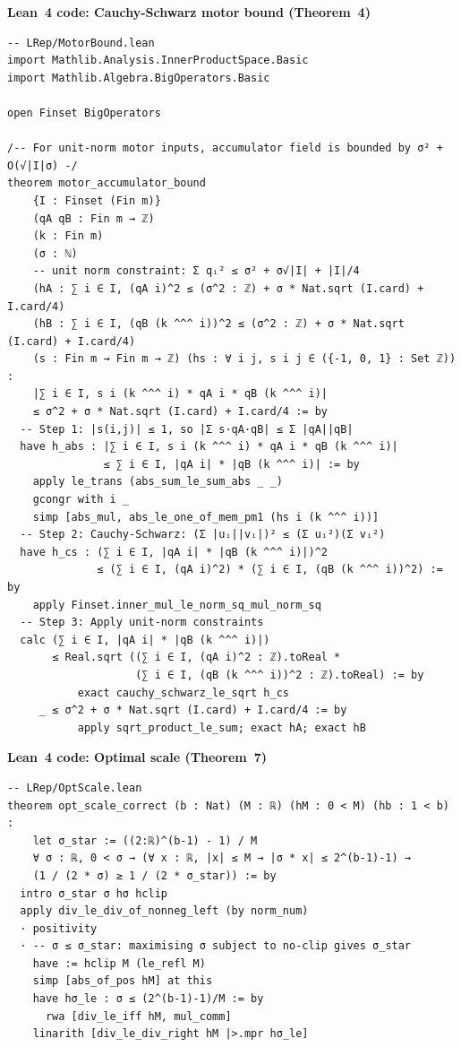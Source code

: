 \documentclass[11pt,a4paper]{article}
\theoremstyle{definition}
\theoremstyle{plain}
\theoremstyle{remark}
\begin{document}
\begin{leanblock}
\textbf{Lean~4 code: Cauchy-Schwarz motor bound (Theorem~4)}
\begin{lstlisting}[language={}]
-- LRep/MotorBound.lean
import Mathlib.Analysis.InnerProductSpace.Basic
import Mathlib.Algebra.BigOperators.Basic

open Finset BigOperators

/-- For unit-norm motor inputs, accumulator field is bounded by σ² + O(√|I|σ) -/
theorem motor_accumulator_bound
    {I : Finset (Fin m)}
    (qA qB : Fin m → ℤ)
    (k : Fin m)
    (σ : ℕ)
    -- unit norm constraint: Σ qᵢ² ≤ σ² + σ√|I| + |I|/4
    (hA : ∑ i ∈ I, (qA i)^2 ≤ (σ^2 : ℤ) + σ * Nat.sqrt (I.card) + I.card/4)
    (hB : ∑ i ∈ I, (qB (k ^^^ i))^2 ≤ (σ^2 : ℤ) + σ * Nat.sqrt (I.card) + I.card/4)
    (s : Fin m → Fin m → ℤ) (hs : ∀ i j, s i j ∈ ({-1, 0, 1} : Set ℤ)) :
    |∑ i ∈ I, s i (k ^^^ i) * qA i * qB (k ^^^ i)|
    ≤ σ^2 + σ * Nat.sqrt (I.card) + I.card/4 := by
  -- Step 1: |s(i,j)| ≤ 1, so |Σ s·qA·qB| ≤ Σ |qA||qB|
  have h_abs : |∑ i ∈ I, s i (k ^^^ i) * qA i * qB (k ^^^ i)|
               ≤ ∑ i ∈ I, |qA i| * |qB (k ^^^ i)| := by
    apply le_trans (abs_sum_le_sum_abs _ _)
    gcongr with i _
    simp [abs_mul, abs_le_one_of_mem_pm1 (hs i (k ^^^ i))]
  -- Step 2: Cauchy-Schwarz: (Σ |uᵢ||vᵢ|)² ≤ (Σ uᵢ²)(Σ vᵢ²)
  have h_cs : (∑ i ∈ I, |qA i| * |qB (k ^^^ i)|)^2
              ≤ (∑ i ∈ I, (qA i)^2) * (∑ i ∈ I, (qB (k ^^^ i))^2) := by
    apply Finset.inner_mul_le_norm_sq_mul_norm_sq
  -- Step 3: Apply unit-norm constraints
  calc (∑ i ∈ I, |qA i| * |qB (k ^^^ i)|)
       ≤ Real.sqrt ((∑ i ∈ I, (qA i)^2 : ℤ).toReal *
                    (∑ i ∈ I, (qB (k ^^^ i))^2 : ℤ).toReal) := by
           exact cauchy_schwarz_le_sqrt h_cs
     _ ≤ σ^2 + σ * Nat.sqrt (I.card) + I.card/4 := by
           apply sqrt_product_le_sum; exact hA; exact hB
\end{lstlisting}
\end{leanblock}

\begin{leanblock}
\textbf{Lean~4 code: Optimal scale (Theorem~7)}
\begin{lstlisting}[language={}]
-- LRep/OptScale.lean
theorem opt_scale_correct (b : Nat) (M : ℝ) (hM : 0 < M) (hb : 1 < b) :
    let σ_star := ((2:ℝ)^(b-1) - 1) / M
    ∀ σ : ℝ, 0 < σ → (∀ x : ℝ, |x| ≤ M → |σ * x| ≤ 2^(b-1)-1) →
    (1 / (2 * σ) ≥ 1 / (2 * σ_star)) := by
  intro σ_star σ hσ hclip
  apply div_le_div_of_nonneg_left (by norm_num)
  · positivity
  · -- σ ≤ σ_star: maximising σ subject to no-clip gives σ_star
    have := hclip M (le_refl M)
    simp [abs_of_pos hM] at this
    have hσ_le : σ ≤ (2^(b-1)-1)/M := by
      rwa [div_le_iff hM, mul_comm]
    linarith [div_le_div_right hM |>.mpr hσ_le]
\end{lstlisting}
\end{leanblock}
\end{document}
